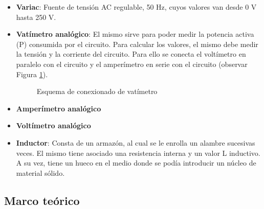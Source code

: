 \documentclass{article}
\begin{document}
        \begin{itemize}
            \renewcommand{\labelitemi}{$\bullet$}
            \item {\bfseries Variac}: Fuente de tensión AC regulable, 50 Hz, cuyos valores van desde 0 V hasta 250 V.
            \item {\bfseries Vatímetro analógico}: El mismo sirve para poder medir la potencia activa (P) consumida por el circuito.
                    Para calcular los valores, el mismo debe medir la tensión y la corriente del circuito.
                     Para ello se conecta el voltímetro en paralelo con el circuito y el amperímetro en serie 
                     con el circuito (observar Figura \ref{fig:vatimetro}). \par

                    \begin{figure}[h!] %
                        \centering
                        \caption{Esquema de conexionado de vatímetro}
                        \label{fig:vatimetro}
                    \end{figure}
            \item {\bfseries Amperímetro analógico}
            \item {\bfseries Voltímetro analógico}
            \item {\bfseries Inductor}: Consta de un armazón, al cual se le enrolla un
             alambre sucesivas veces. El mismo tiene asociado una resistencia interna y un valor L inductivo. 
                A su vez, tiene un hueco en el medio donde se podía introducir un núcleo de material sólido. 
        \end{itemize}
        
        \subsection{Marco teórico}
\end{document}
